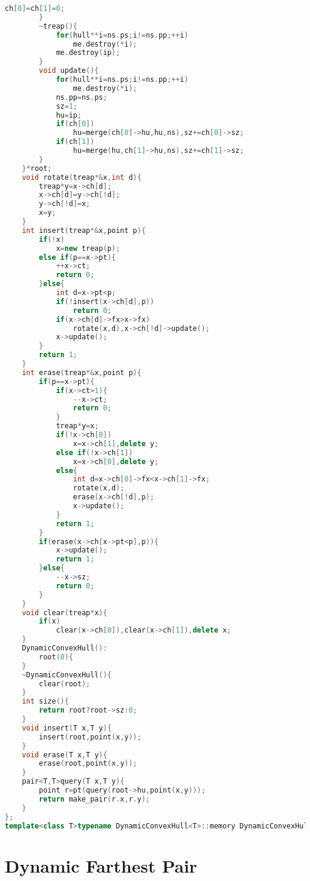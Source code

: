 \documentclass{book}
\begin{document}
\begin{lstlisting}[language=C++,title={Dynamic Convex Hull (Treap).hpp (9485 bytes, 327 lines)}]
            ch[0]=ch[1]=0;
        }
        ~treap(){
            for(hull**i=ns.ps;i!=ns.pp;++i)
                me.destroy(*i);
            me.destroy(ip);
        }
        void update(){
            for(hull**i=ns.ps;i!=ns.pp;++i)
                me.destroy(*i);
            ns.pp=ns.ps;
            sz=1;
            hu=ip;
            if(ch[0])
                hu=merge(ch[0]->hu,hu,ns),sz+=ch[0]->sz;
            if(ch[1])
                hu=merge(hu,ch[1]->hu,ns),sz+=ch[1]->sz;
        }
    }*root;
    void rotate(treap*&x,int d){
        treap*y=x->ch[d];
        x->ch[d]=y->ch[!d];
        y->ch[!d]=x;
        x=y;
    }
    int insert(treap*&x,point p){
        if(!x)
            x=new treap(p);
        else if(p==x->pt){
            ++x->ct;
            return 0;
        }else{
            int d=x->pt<p;
            if(!insert(x->ch[d],p))
                return 0;
            if(x->ch[d]->fx>x->fx)
                rotate(x,d),x->ch[!d]->update();
            x->update();
        }
        return 1;
    }
    int erase(treap*&x,point p){
        if(p==x->pt){
            if(x->ct>1){
                --x->ct;
                return 0;
            }
            treap*y=x;
            if(!x->ch[0])
                x=x->ch[1],delete y;
            else if(!x->ch[1])
                x=x->ch[0],delete y;
            else{
                int d=x->ch[0]->fx<x->ch[1]->fx;
                rotate(x,d);
                erase(x->ch[!d],p);
                x->update();
            }
            return 1;
        }
        if(erase(x->ch[x->pt<p],p)){
            x->update();
            return 1;
        }else{
            --x->sz;
            return 0;
        }
    }
    void clear(treap*x){
        if(x)
            clear(x->ch[0]),clear(x->ch[1]),delete x;
    }
    DynamicConvexHull():
        root(0){
    }
    ~DynamicConvexHull(){
        clear(root);
    }
    int size(){
        return root?root->sz:0;
    }
    void insert(T x,T y){
        insert(root,point(x,y));
    }
    void erase(T x,T y){
        erase(root,point(x,y));
    }
    pair<T,T>query(T x,T y){
        point r=pt(query(root->hu,point(x,y)));
        return make_pair(r.x,r.y);
    }
};
template<class T>typename DynamicConvexHull<T>::memory DynamicConvexHull<T>::me;
\end{lstlisting}
\section{Dynamic Farthest Pair}
\end{document}

